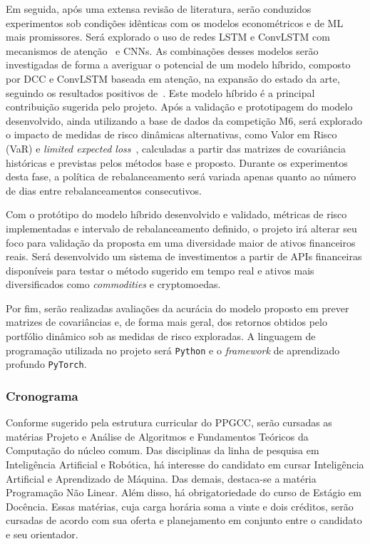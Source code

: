 \documentclass[a4paper, 12pt]{article}
\begin{document}
\begin{spacing}{.9}
Em seguida, após uma extensa revisão de literatura, serão conduzidos
experimentos sob condições idênticas com os modelos econométricos e de ML mais
promissores. Será explorado o uso de redes LSTM e ConvLSTM com mecanismos de
atenção~\cite{attention} e CNNs. As combinações desses modelos serão
investigadas de forma a averiguar o potencial de um modelo híbrido, composto
por DCC e ConvLSTM baseada em atenção, na expansão do estado da arte, seguindo
os resultados positivos de~\cite{dl_multi}. Este modelo híbrido é a principal
contribuição sugerida pelo projeto. Após a validação e prototipagem do modelo
desenvolvido, ainda utilizando a base de dados da competição M6, será explorado
o impacto de medidas de risco dinâmicas alternativas, como Valor em Risco (VaR)
e \emph{limited expected loss}~\cite{gambrah2014risk}, calculadas a partir das
matrizes de covariância históricas e previstas pelos métodos base e proposto.
Durante os experimentos desta fase, a política de rebalanceamento será variada
apenas quanto ao número de dias entre rebalanceamentos consecutivos.

Com o protótipo do modelo híbrido desenvolvido e validado, métricas de risco
implementadas e intervalo de rebalanceamento definido, o projeto irá alterar seu
foco para validação da proposta em uma diversidade maior de ativos financeiros
reais. Será desenvolvido um sistema de investimentos a partir de APIs
financeiras disponíveis para testar o método sugerido em tempo real e ativos
mais diversificados como \emph{commodities} e cryptomoedas.

Por fim, serão realizadas avaliações da acurácia do modelo proposto em prever
matrizes de covariâncias e, de forma mais geral, dos retornos obtidos pelo
portfólio dinâmico sob as medidas de risco exploradas. A linguagem de
programação utilizada no projeto será \verb+Python+ e o \emph{framework} de
aprendizado profundo \verb+PyTorch+.

\subsubsection*{Cronograma}

Conforme sugerido pela estrutura curricular do PPGCC, serão cursadas as
matérias Projeto e Análise de Algoritmos e Fundamentos Teóricos da Computação
do núcleo comum. Das disciplinas da linha de pesquisa em Inteligência
Artificial e Robótica, há interesse do candidato em cursar Inteligência
Artificial e Aprendizado de Máquina. Das demais, destaca-se a
matéria Programação Não Linear. Além disso, há obrigatoriedade do curso de Estágio
em Docência. Essas matérias, cuja carga horária soma a vinte e dois créditos,
serão cursadas de acordo com sua oferta e planejamento em conjunto entre o
candidato e seu orientador.


\end{spacing}
\end{document}

